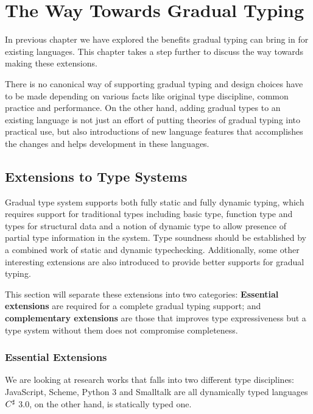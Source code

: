 
\renewcommand{\thechapter}{3}

\chapter{The Way Towards Gradual Typing}


In previous chapter we have explored the benefits gradual typing
can bring in for existing languages.
This chapter takes a step further to discuss the way towards making these extensions.

There is no canonical way of supporting gradual typing and design choices have to be made
depending on various facts like original type discipline, common practice and performance.
On the other hand, adding gradual types to an existing language
is not just an effort of putting theories of gradual typing into practical use,
but also introductions of new language features that accomplishes the changes
and helps development in these languages.

\section{Extensions to Type Systems}

Gradual type system supports both fully static and fully dynamic typing,
which requires support for traditional types including
basic type, function type and types for structural data
and a notion of dynamic type to allow presence of partial type information in the system.
Type soundness should be established by a combined work of static and dynamic typechecking.
Additionally, some other interesting extensions are also introduced to provide better
supports for gradual typing.

This section will separate these extensions into two categories:
\textbf{Essential extensions} are required for a complete gradual typing support;
and \textbf{complementary extensions} are those that improves type expressiveness
but a type system without them does not compromise completeness.

\subsection{Essential Extensions}

We are looking at research works that falls into two different type disciplines:
JavaScript, Scheme, Python 3 and Smalltalk are all dynamically typed languages
$C^\sharp$ 3.0, on the other hand, is statically typed one.

